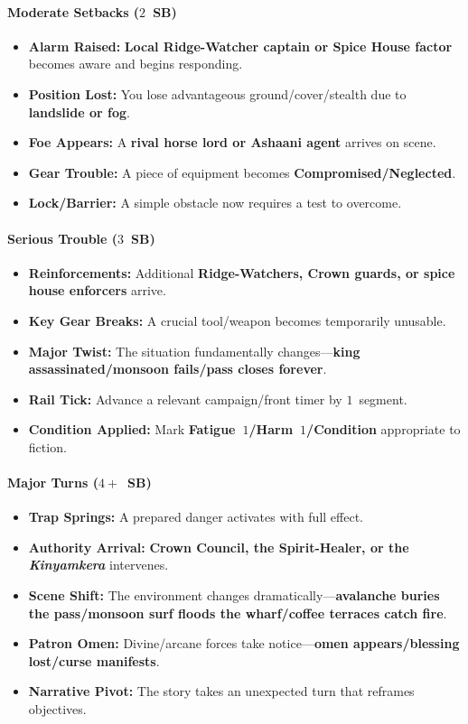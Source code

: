 \paragraph{Moderate Setbacks ($2$~SB)}
\begin{itemize}
\item \textbf{Alarm Raised:} \textbf{Local Ridge-Watcher captain or Spice House factor} becomes aware and begins responding.
\item \textbf{Position Lost:} You lose advantageous ground/cover/stealth due to \textbf{landslide or fog}.
\item \textbf{Foe Appears:} A \textbf{rival horse lord or Ashaani agent} arrives on scene.
\item \textbf{Gear Trouble:} A piece of equipment becomes \textbf{Compromised/Neglected}.
\item \textbf{Lock/Barrier:} A simple obstacle now requires a test to overcome.
\end{itemize}

\paragraph{Serious Trouble ($3$~SB)}
\begin{itemize}
\item \textbf{Reinforcements:} Additional \textbf{Ridge-Watchers, Crown guards, or spice house enforcers} arrive.
\item \textbf{Key Gear Breaks:} A crucial tool/weapon becomes temporarily unusable.
\item \textbf{Major Twist:} The situation fundamentally changes---\textbf{king assassinated/monsoon fails/pass closes forever}.
\item \textbf{Rail Tick:} Advance a relevant campaign/front timer by $1$~segment.
\item \textbf{Condition Applied:} Mark \textbf{Fatigue~$1$/Harm~$1$/Condition} appropriate to fiction.
\end{itemize}

\paragraph{Major Turns ($4+$~SB)}
\begin{itemize}
\item \textbf{Trap Springs:} A prepared danger activates with full effect.
\item \textbf{Authority Arrival:} \textbf{Crown Council, the Spirit-Healer, or the \textit{Kinyamkera}} intervenes.
\item \textbf{Scene Shift:} The environment changes dramatically---\textbf{avalanche buries the pass/monsoon surf floods the wharf/coffee terraces catch fire}.
\item \textbf{Patron Omen:} Divine/arcane forces take notice---\textbf{omen appears/blessing lost/curse manifests}.
\item \textbf{Narrative Pivot:} The story takes an unexpected turn that reframes objectives.
\end{itemize}

